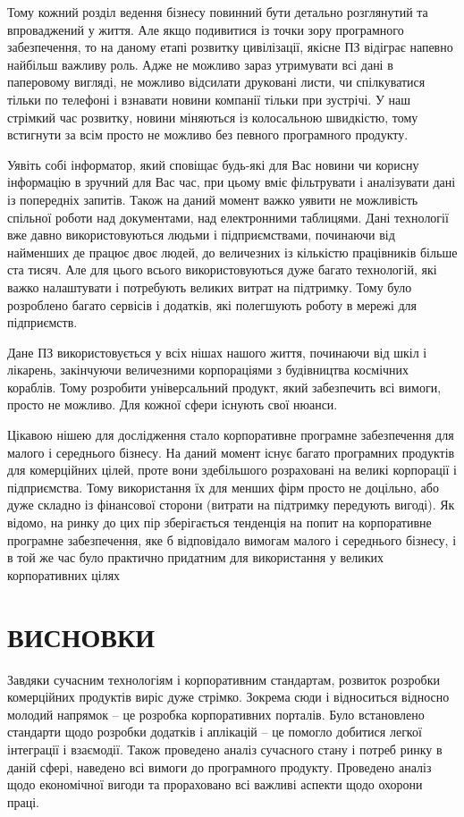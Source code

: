 Тому кожний розділ ведення бізнесу повинний бути детально розглянутий та впроваджений у життя. 
Але якщо подивитися із точки зору програмного забезпечення, то на даному етапі розвитку цивілізації, якісне ПЗ відіграє напевно найбільш важливу роль. 
Адже не можливо зараз утримувати всі дані в паперовому вигляді, не можливо відсилати друковані листи, чи спілкуватися тільки по телефоні і взнавати новини компанії тільки при зустрічі. 
У наш стрімкий час розвитку, новини міняються із колосальною швидкістю, тому встигнути за всім просто не можливо без певного програмного продукту. 
\par Уявіть собі інформатор, який сповіщає будь-які для Вас новини чи корисну інформацію в зручний для Вас час, при цьому вміє фільтрувати і аналізувати дані із попередніх запитів. 
Також на даний момент важко уявити не можливість спільної роботи над документами, над електронними таблицями. 
Дані технології вже давно використовуються людьми і підприємствами, починаючи від найменших де працює двоє людей, до величезних із кількістю працівників більше ста тисяч. 
Але для цього всього використовуються дуже багато технологій, які важко налаштувати і потребують великих витрат на підтримку.
Тому було розроблено багато сервісів і додатків, які полегшують роботу в мережі для підприємств.
\par Дане ПЗ використовується у всіх нішах нашого життя, починаючи від шкіл і лікарень, закінчуючи величезними корпораціями з будівництва космічних кораблів. 
Тому розробити універсальний продукт, який забезпечить всі вимоги, просто не можливо. 
Для кожної сфери існують свої нюанси.
\par Цікавою нішею для дослідження стало корпоративне програмне забезпечення для малого і середнього бізнесу.
 На даний момент існує багато програмних продуктів для комерційних цілей, проте вони здебільшого розраховані на великі корпорації і підприємства.
Тому використання їх для менших фірм просто не доцільно, або дуже складно із фінансової сторони (витрати на підтримку передують вигоді).
Як відомо, на ринку до цих пір зберігається тенденція на попит на корпоративне програмне забезпечення, яке б відповідало вимогам малого і середнього бізнесу, і в той же час було практично придатним для використання у великих корпоративних цілях









\section*{ВИСНОВКИ}
Завдяки сучасним технологіям і корпоративним стандартам, розвиток розробки комерційних продуктів виріс дуже стрімко. 
Зокрема сюди і відноситься відносно молодий напрямок -- це розробка корпоративних порталів. 
Було встановлено стандарти щодо розробки додатків і аплікацій -- це помогло добитися легкої інтеграції і взаємодії. 
Також проведено аналіз сучасного стану і потреб ринку в даній сфері, наведено всі вимоги до програмного продукту.
Проведено аналіз щодо економічної вигоди та прораховано всі важливі аспекти щодо охорони праці.



